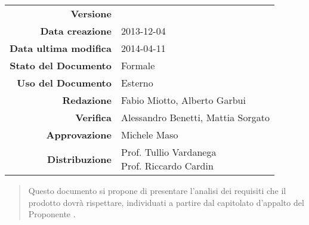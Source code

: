 

\newcommand{\Versione}{\versioneAnalisiDeiRequisiti{}}	%
\newcommand{\Data}{2013-12-04}							%
\newcommand{\DataUltimaModifica}{2014-04-11}
\newcommand{\TipoDocumento}{Analisi dei Requisiti}		%






\begin{center}
\begin{tabular}{r|l}
\textbf{Versione} & \Versione{} \\
\textbf{Data creazione} & \Data{} \\
\textbf{Data ultima modifica} & \DataUltimaModifica{} \\
\textbf{Stato del Documento} & Formale \\					%
\textbf{Uso del Documento} & Esterno \\						%
\textbf{Redazione} & Fabio Miotto, Alberto Garbui\\			%
\textbf{Verifica} & Alessandro Benetti, Mattia Sorgato\\	%
\textbf{Approvazione} & Michele Maso\\					    %
\textbf{Distribuzione} & \parbox[t]{4cm}{Prof. Tullio Vardanega \\ Prof. Riccardo Cardin \\ \Prop{} }\\
\end{tabular}
\end{center}

\vspace{0.05in}

\begin{abstract}
\begin{center}
Questo documento si propone di presentare l'analisi dei requisiti che il prodotto \Progetto{} dovrà rispettare, individuati a partire dal capitolato d'appalto del Proponente \Prop{}.
\end{center}
\end{abstract}


